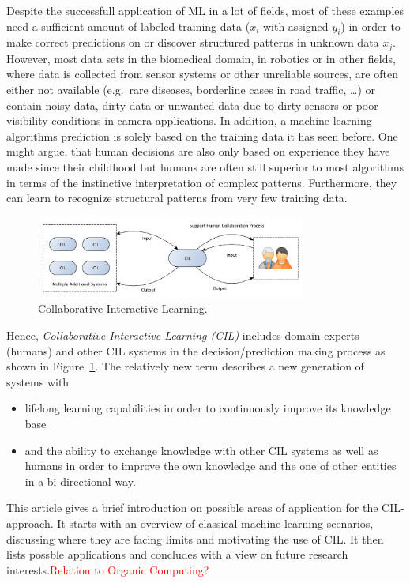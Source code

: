 \documentclass[conference,compsoc]{IEEEtran}
\newcommand\notes[1]{\textcolor{red}{#1}}
\begin{document}
Despite the successfull application of ML in a lot of fields, most of these examples 
need a sufficient amount of labeled training data ($x_i$ with assigned $y_i$) in order to make 
correct predictions on or discover structured patterns in unknown data $x_j$. However, most 
data sets in the biomedical domain, in robotics or in other fields, where data is collected 
from sensor systems or other unreliable sources, are often either not available (e.g.\ rare 
diseases, borderline cases in road traffic, \dots) or contain noisy data, dirty data or unwanted 
data due to dirty sensors or poor visibility conditions in camera applications.
In addition, a machine learning algorithms prediction is solely based on the training data it 
has seen before. One might argue, that human decisions are also only based on experience they have 
made since their childhood but humans are often still superior to most algorithms in terms of 
the instinctive interpretation of complex patterns. Furthermore, they can learn to recognize 
structural patterns from very few training data.

\begin{figure}[!h]
\centering
\includegraphics[width=3.5in]{images/CIL}
\caption{Collaborative Interactive Learning.}
\label{fig:CIL}
\end{figure}

Hence, \textit{Collaborative Interactive Learning (CIL)} includes domain experts (humans) 
and other CIL systems in the decision/prediction making process as shown in 
Figure~\ref{fig:CIL}. The relatively new term describes a new 
generation of systems with
\begin{itemize}
    \item lifelong learning capabilities in order to continuously improve its 
        knowledge base
    \item and the ability to exchange knowledge with other CIL systems as well as humans 
        in order to improve the own knowledge and the one of other entities in a 
        bi-directional way\cite{CIL:sick}.
\end{itemize}

This article gives a brief introduction on possible areas of application for the CIL-approach. 
It starts with an overview of classical machine learning scenarios, discussing where they are 
facing limits and motivating the use of CIL\@. It then lists possble applications and concludes 
with a view on future research interests.\notes{Relation to Organic Computing?}
\end{document}
